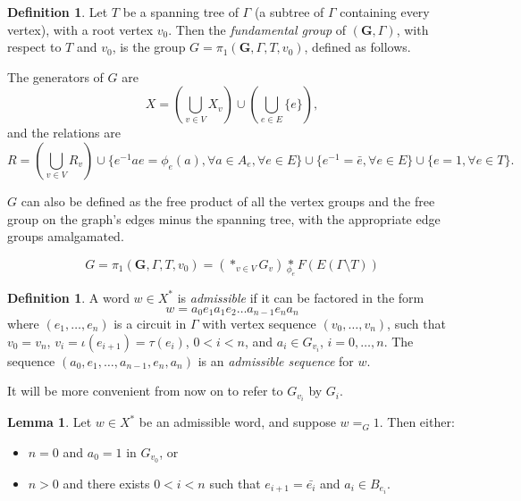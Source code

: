 \documentclass[a4paper]{article}
\newcommand{\fgoagog}{\pi_1(\mathbf{G},\Gamma,T,v_0)}	%
\theoremstyle{plain}
\theoremstyle{definition}
\newtheorem{lemma}[theorem]{Lemma}
\newtheorem{definition}[theorem]{Definition}
\begin{document}
\begin{definition}
	Let $T$ be a spanning tree of $\Gamma$ (a subtree of $\Gamma$ containing every vertex), with a root vertex $v_0$. Then the {\it fundamental group} \cite{Serre_1977} of $(\mathbf{G},\Gamma)$, with respect to $T$ and $v_0$, is the group $G = \fgoagog$, defined as follows.

The generators of $G$ are
\[ X = \left( \bigcup_{v \in V}X_v \right) \cup \left( \bigcup_{e \in E}\{e\} \right),\]
and the relations are 
\[ R = \left( \bigcup_{v \in V}R_v \right) \cup \{e^{-1}ae = \phi_e(a),  \forall a \in A_e, \forall e \in E\} \cup \{ e^{-1} = \bar{e}, \forall e \in E\} \cup \{ e = 1, \forall e \in T \}.\]

$G$ can also be defined as the free product of all the vertex groups and the free group on the graph's edges minus the spanning tree, with the appropriate edge groups amalgamated.

\begin{equation}
G = \fgoagog = \left( \ast_{v \in V} G_v \right) \underset{\phi_e}{\ast} F(E(\Gamma \setminus T))
\end{equation}

\end{definition}

\begin{definition}
A word $w \in X^{\ast}$ is {\it admissible} if it can be factored in the form
\[ w = a_0 e_1 a_1 e_2 \dots a_{n-1} e_n a_n \]
where $(e_1,\dots,e_n)$ is a circuit in $\Gamma$ with vertex sequence $(v_0,\dots,v_n)$, such that $v_0 = v_n$, $v_i = \iota(e_{i+1})=\tau(e_i)$, $0 < i < n$, and $a_i \in G_{v_i}$, $i=0,\dots,n$. The sequence $(a_0,e_1, \dots, a_{n-1},e_n,a_n)$ is an {\it admissible sequence} for $w$.
\end{definition}

It will be more convenient from now on to refer to $G_{v_i}$ by $G_i$.

\begin{lemma}
	\label{trivialnormalform} \cite[Proposition 2.4]{Kapovich_2005}
Let $w \in X^{\ast}$ be an admissible word, and suppose $w =_G 1$. Then either:
\begin{itemize}
	\item $n=0$ and $a_0=1$ in $G_{v_0}$, or
	\item $n > 0$ and there exists $0<i<n$ such that $e_{i+1}=\bar{e_i}$ and $a_i \in B_{e_i}$.
\end{itemize}
\end{lemma}
\end{document}
